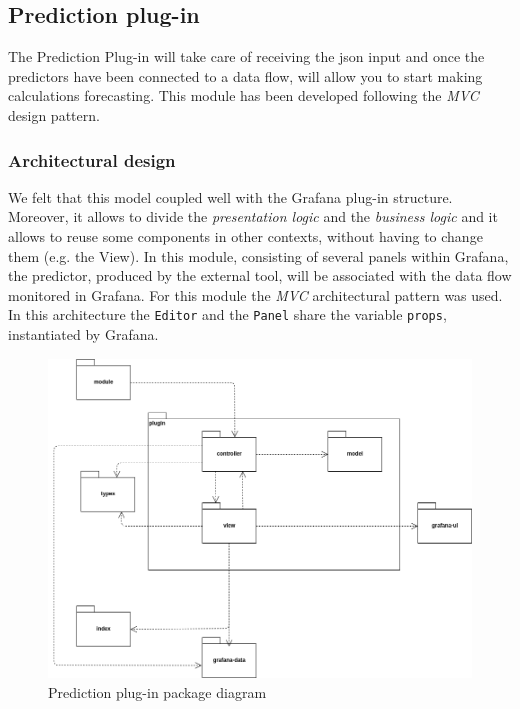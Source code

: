 \subsection{Prediction plug-in}
The Prediction Plug-in will take care of receiving the json input and once the predictors have been connected to a data flow, will allow you to start making calculations forecasting. This module has been developed following the \textit{MVC} design pattern.

\subsubsection{Architectural design}
We felt that this model coupled well with the Grafana plug-in structure.
Moreover, it allows to divide the \textit{presentation logic} and the \textit{business logic} and it allows to reuse some components in other contexts, without having to change them (e.g. the View).
In this module, consisting of several panels within Grafana, the predictor, produced by the external tool, will be associated with the data flow monitored in Grafana. For this module the \textit{MVC} architectural pattern was used. In this architecture the \texttt{Editor} and the \texttt{Panel} share the variable \texttt{props}, instantiated by Grafana.

\begin{figure}[H]
\centering
\includegraphics[scale=0.45]{../../../Diagrams/Package_diagrams/plugin_design_pattern.png}
\caption{Prediction plug-in package diagram}
\end{figure}

